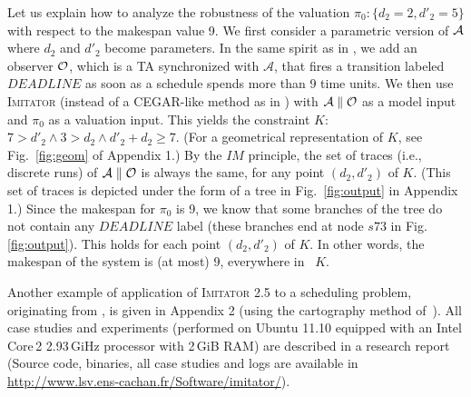 \documentclass{llncs}
\newcommand{\A}{\mathcal{A}}
\newcommand{\Ko}{K}
\newcommand{\pio}{\pi_0}
\newcommand{\IM}{\mathit{IM}}
\newcommand{\imitator}{\textsc{Imitator}}
\begin{document}
Let us explain how to analyze the robustness of the
valuation $\pio:\{d_2=2,d'_2=5\}$ with respect to the makespan value 9.
We first consider a parametric version of ${\cal A}$ where
$d_2$ and $d'_2$ become parameters.
In the same spirit as in \cite{cpr08},
we add an observer ${\cal O}$, which is a TA
synchronized with $\A$, that fires a transition labeled $\mathit{DEADLINE}$ as soon as a schedule spends more than 9 time units.
We then use \imitator{} (instead of a CEGAR-like method
as in \cite{cpr08}) with $\A \parallel {\cal O}$ as a model input
and $\pio$ as a valuation input.
This yields the constraint $\Ko$:  $7 > d'_2 \wedge 3 > d_2 \wedge d'_2 + d_2 \geq 7$.
(For a geometrical representation of $\Ko$, see Fig.~\ref{fig:geom} of Appendix 1.)
By the $\IM$ principle, the set of traces (i.e., discrete runs) of
$\A \parallel {\cal O}$ is always the same,
for any point $(d_2,d'_2)$ of $\Ko$.
(This set of traces is depicted under the form of a tree in Fig.~\ref{fig:output} in Appendix 1.)
Since the makespan for $\pio$ is 9,
we know that some branches of the tree do not contain
any $\mathit{DEADLINE}$ label (these branches end at node $s73$
in Fig. \ref{fig:output}).
This holds for each point $(d_2,d'_2)$ of $\Ko$.
In other words, the makespan of the system is  (at most) 9, everywhere in~ $\Ko$. 


Another example of application of \imitator{} 2.5 to a scheduling problem, originating from \cite{bb04}, is given in Appendix 2 (using 
the cartography method of~\cite{af10}). 
All case studies and experiments (performed on Ubuntu 11.10 equipped with an Intel Core\,2 2.93\,GiHz processor with 2\,GiB RAM) are described in a research report~\cite{soulat12} (Source code, binaries, all case studies and logs are available in \url{http://www.lsv.ens-cachan.fr/Software/imitator/}).
\end{document}
